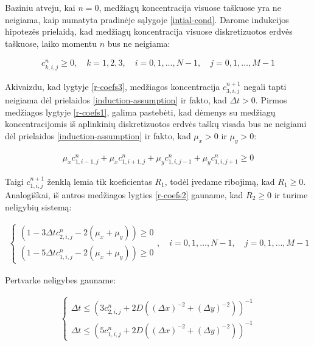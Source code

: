 Baziniu atveju, kai $n=0$, medžiagų koncentracija visuose taškuose yra ne neigiama, kaip numatyta pradinėje sąlygoje \eqref{intial-cond}. Darome indukcijos hipotezės prielaidą, kad medžiagų koncentracija visuose diskretizuotos erdvės taškuose, laiko momentu $n$ bus ne neigiama:

\begin{align} \label{induction-assumption}
    c^n_{k,i,j} \geqslant 0, \quad k=1,2,3,\quad i=0,1,\dots,N-1,\quad j=0,1,\dots,M-1
\end{align}

Akivaizdu, kad lygtyje \eqref{r-coefs3}, medžiagos koncentracija $c^{n+1}_{3,i,j}$ negali tapti neigiama dėl prielaidos \eqref{induction-assumption} ir fakto, kad $\Delta t>0$. Pirmos medžiagos lygtyje \eqref{r-coefs1}, galima pastebėti, kad dėmenys su medžiagų koncentracijomis iš aplinkinių diskretizuotos erdvės taškų visada bus ne neigiami dėl prielaidos \eqref{induction-assumption} ir fakto, kad $\mu_x>0$ ir $\mu_y>0$:

\begin{align*}
    \mu_xc^n_{1,i-1,j}+\mu_xc^n_{1,i+1,j}+\mu_yc^n_{1,i,j-1}+\mu_yc^n_{1,i,j+1}\geqslant 0
\end{align*}

Taigi $c^{n+1}_{1,i,j}$ ženklą lemia tik koeficientas $R_1$, todėl įvedame ribojimą, kad $R_1\geqslant 0$. Analogiškai, iš antros medžiagos lygties \eqref{r-coefs2} gauname, kad $R_2\geqslant 0$ ir turime neligybių sistemą:

\begin{align}
  \begin{cases}
    (1-3\Delta tc^{n}_{2,i,j}-2(\mu_x+\mu_y))\geqslant 0\\
    (1-5\Delta tc^{n}_{1,i,j}-2(\mu_x+\mu_y))\geqslant 0
  \end{cases}, \quad i=0,1,\dots,N-1, \quad j=0,1,\dots,M-1
\end{align}

Pertvarke neligybes gauname:

\begin{align}
  \begin{cases}
    \Delta t \leqslant (3c^{n}_{2,i,j}+2D((\Delta x)^{-2}+(\Delta y)^{-2}))^{-1}\\
    \Delta t \leqslant (5c^{n}_{1,i,j}+2D((\Delta x)^{-2}+(\Delta y)^{-2}))^{-1}
  \end{cases}
\end{align}


